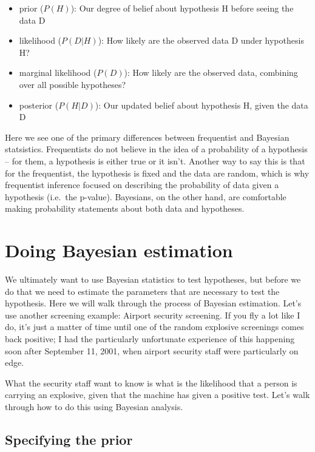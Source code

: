 \documentclass[]{book}
\providecommand{\tightlist}{%
  \setlength{\itemsep}{0pt}\setlength{\parskip}{0pt}}
\theoremstyle{definition}
\theoremstyle{definition}
\theoremstyle{definition}
\theoremstyle{remark}
\begin{document}
\begin{itemize}
\tightlist
\item
  prior (\(P(H)\)): Our degree of belief about hypothesis H before
  seeing the data D
\item
  likelihood (\(P(D|H)\)): How likely are the observed data D under
  hypothesis H?
\item
  marginal likelihood (\(P(D)\)): How likely are the observed data,
  combining over all possible hypotheses?
\item
  posterior (\(P(H|D)\)): Our updated belief about hypothesis H, given
  the data D
\end{itemize}

Here we see one of the primary differences between frequentist and
Bayesian statsistics. Frequentists do not believe in the idea of a
probability of a hypothesis -- for them, a hypothesis is either true or
it isn't. Another way to say this is that for the frequentist, the
hypothesis is fixed and the data are random, which is why frequentist
inference focused on describing the probability of data given a
hypothesis (i.e.~the p-value). Bayesians, on the other hand, are
comfortable making probability statements about both data and
hypotheses.

\section{Doing Bayesian estimation}\label{doing-bayesian-estimation}

We ultimately want to use Bayesian statistics to test hypotheses, but
before we do that we need to estimate the parameters that are necessary
to test the hypothesis. Here we will walk through the process of
Bayesian estimation. Let's use another screening example: Airport
security screening. If you fly a lot like I do, it's just a matter of
time until one of the random explosive screenings comes back positive; I
had the particularly unfortunate experience of this happening soon after
September 11, 2001, when airport security staff were particularly on
edge.

What the security staff want to know is what is the likelihood that a
person is carrying an explosive, given that the machine has given a
positive test. Let's walk through how to do this using Bayesian
analysis.

\subsection{Specifying the prior}\label{specifying-the-prior}
\end{document}
